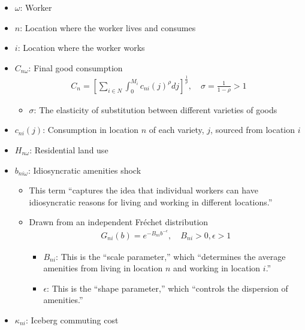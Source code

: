

\begin{itemize}
    \item $\omega$: Worker
    \item $n$: Location where the worker lives and consumes
    \item $i$: Location where the worker works
    \item $C_{n \omega}$: Final good consumption
        \begin{align}
            C_n=\left[\sum_{i \in N} \int_0^{M_i} c_{n i}(j)^\rho d j\right]^{\frac{1}{\rho}}, \quad \sigma=\frac{1}{1-\rho}>1 \label{eq:good_consumption_index}
        \end{align}
        \begin{itemize}
            \item $\sigma$: The elasticity of substitution between different varieties of goods
        \end{itemize}
    \item $c_{n i}(j)$: Consumption in location $n$ of each variety, $j$, sourced from location $i$
    \item $H_{n \omega}$: Residential land use
    \item $b_{n i \omega}$: Idiosyncratic amenities shock
        \begin{itemize}
            \item This term ``captures the idea that individual workers can have
            idiosyncratic reasons for living and working in different locations.''
            \item Drawn from an independent Fréchet distribution
                \begin{align}
                    G_{n i}(b)=e^{-B_{n i} b^{-\epsilon}}, \quad B_{n i}>0, \epsilon>1
                \end{align}
                \begin{itemize}
                    \item $B_{n i}$: This is the ``scale parameter,'' which ``determines the average amenities from living in location $n$ and working in location $i$.''
                    \item $\epsilon$: This is the ``shape parameter,'' which ``controls the dispersion of amenities.''
                \end{itemize}
        \end{itemize}
    \item $\kappa_{n i}$: Iceberg commuting cost
        \begin{itemize}

\end{itemize}
\end{itemize}
